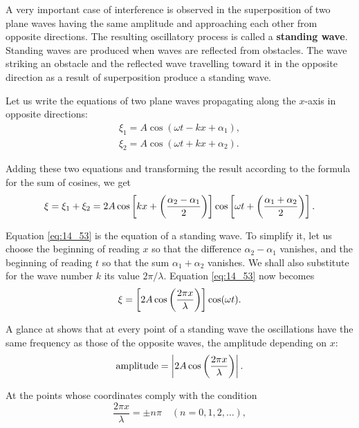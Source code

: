A very important case of interference is observed in the superposition of two plane waves having the same amplitude and approaching each other from opposite directions.
The resulting oscillatory process is called a \textbf{standing wave}.
Standing waves are produced when waves are reflected from obstacles.
The wave striking an obstacle and the reflected wave travelling toward it in the opposite direction as a result of superposition produce a standing wave.

Let us write the equations of two plane waves propagating along the $x$-axis in opposite directions:
\begin{align*}
	\xi_1 = A \cos(\omega t - kx + \alpha_1),\\
	\xi_2 = A \cos(\omega t + kx + \alpha_2).
\end{align*}

\noindent
Adding these two equations and transforming the result according to the formula for the sum of cosines, we get
\begin{equation}\label{eq:14_53}
	\xi = \xi_1 + \xi_2 = 2A \cos\left[kx + \left(\frac{\alpha_2-\alpha_1}{2}\right)\right] \cos\left[\omega t + \left(\frac{\alpha_1+\alpha_2}{2}\right)\right].
\end{equation}

\noindent
Equation \eqref{eq:14_53} is the equation of a standing wave.
To simplify it, let us choose the beginning of reading $x$ so that the difference $\alpha_2-\alpha_1$ vanishes, and the beginning of reading $t$ so that the sum $\alpha_1+\alpha_2$ vanishes.
We shall also substitute for the wave number $k$ its value $2\pi/\lambda$.
Equation \eqref{eq:14_53} now becomes
\begin{equation}\label{eq:14_54}
	\xi = \left[2 A \cos\left(\frac{2\pi x}{\lambda}\right)\right] \cos(\omega t).
\end{equation}

A glance at  shows that at every point of a standing wave the oscillations have the same frequency as those of the opposite waves, the amplitude depending on $x$:
\begin{equation*}
	\text{amplitude} = \left| 2 A \cos\left(\frac{2\pi x}{\lambda}\right) \right|.
\end{equation*}

\noindent
At the points whose coordinates comply with the condition
\begin{equation}\label{eq:14_55}
	\frac{2\pi x}{\lambda} = \pm n \pi\quad (n = 0, 1, 2, \ldots),
\end{equation}


